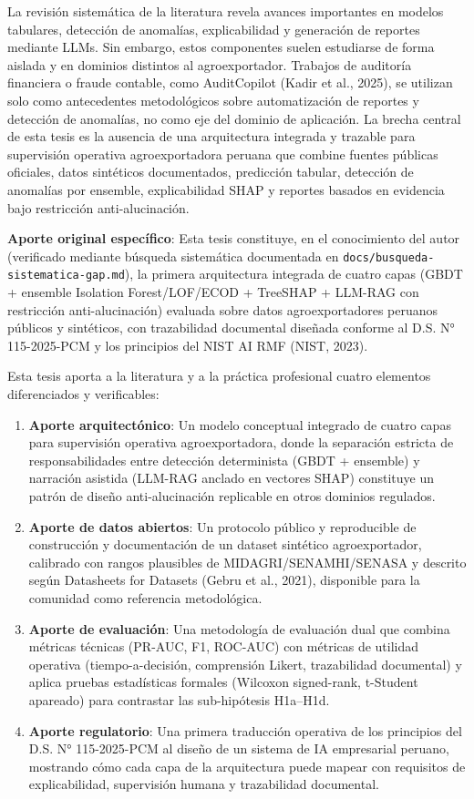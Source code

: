 La revisión sistemática de la literatura revela avances importantes en
modelos tabulares, detección de anomalías, explicabilidad y generación
de reportes mediante LLMs. Sin embargo, estos componentes suelen
estudiarse de forma aislada y en dominios distintos al agroexportador.
Trabajos de auditoría financiera o fraude contable, como AuditCopilot
(Kadir et al., 2025), se utilizan solo como antecedentes metodológicos
sobre automatización de reportes y detección de anomalías, no como eje
del dominio de aplicación. La brecha central de esta tesis es la
ausencia de una arquitectura integrada y trazable para supervisión
operativa agroexportadora peruana que combine fuentes públicas
oficiales, datos sintéticos documentados, predicción tabular, detección
de anomalías por ensemble, explicabilidad SHAP y reportes basados en
evidencia bajo restricción anti-alucinación.

\textbf{Aporte original específico}: Esta tesis constituye, en el
conocimiento del autor (verificado mediante búsqueda sistemática
documentada en \texttt{docs/busqueda-sistematica-gap.md}), la primera
arquitectura integrada de cuatro capas (GBDT + ensemble Isolation
Forest/LOF/ECOD + TreeSHAP + LLM-RAG con restricción anti-alucinación)
evaluada sobre datos agroexportadores peruanos públicos y sintéticos,
con trazabilidad documental diseñada conforme al D.S. N° 115-2025-PCM y
los principios del NIST AI RMF (NIST, 2023).

Esta tesis aporta a la literatura y a la práctica profesional cuatro
elementos diferenciados y verificables:

\begin{enumerate}
\def\labelenumi{\arabic{enumi}.}
\item
  \textbf{Aporte arquitectónico}: Un modelo conceptual integrado de
  cuatro capas para supervisión operativa agroexportadora, donde la
  separación estricta de responsabilidades entre detección determinista
  (GBDT + ensemble) y narración asistida (LLM-RAG anclado en vectores
  SHAP) constituye un patrón de diseño anti-alucinación replicable en
  otros dominios regulados.
\item
  \textbf{Aporte de datos abiertos}: Un protocolo público y reproducible
  de construcción y documentación de un dataset sintético
  agroexportador, calibrado con rangos plausibles de
  MIDAGRI/SENAMHI/SENASA y descrito según Datasheets for Datasets (Gebru
  et al., 2021), disponible para la comunidad como referencia
  metodológica.
\item
  \textbf{Aporte de evaluación}: Una metodología de evaluación dual que
  combina métricas técnicas (PR-AUC, F1, ROC-AUC) con métricas de
  utilidad operativa (tiempo-a-decisión, comprensión Likert,
  trazabilidad documental) y aplica pruebas estadísticas formales
  (Wilcoxon signed-rank, t-Student apareado) para contrastar las
  sub-hipótesis H1a--H1d.
\item
  \textbf{Aporte regulatorio}: Una primera traducción operativa de los
  principios del D.S. N° 115-2025-PCM al diseño de un sistema de IA
  empresarial peruano, mostrando cómo cada capa de la arquitectura puede
  mapear con requisitos de explicabilidad, supervisión humana y
  trazabilidad documental.
\end{enumerate}

